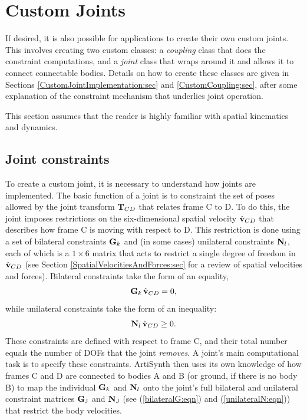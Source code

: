 \section{Custom Joints}

If desired, it is also possible for applications to create their own
custom joints. This involves creating two custom classes: a {\it
coupling} class that does the constraint computations, and a {\it
joint} class that wraps around it and allows it to connect connectable
bodies. Details on how to create these classes are given in
Sections \ref{CustomJointImplementation:sec} and
\ref{CustomCoupling:sec}, after some explanation
of the constraint mechanism that underlies joint operation.

This section assumes that the reader is highly familiar with spatial
kinematics and dynamics.

\subsection{Joint constraints}
\label{JointConstraints:sec}

To create a custom joint, it is necessary to understand how joints are
implemented. The basic function of a joint is to constraint the set of
poses allowed by the joint transform ${\bf T}_{CD}$ that relates frame C to
D. To do this, the joint imposes restrictions on the six-dimensional
spatial velocity $\hat{{\bf v}}_{CD}$ that describes how frame C is moving
with respect to D.  This restriction is done using a set of bilateral
constraints ${\bf G}_k$ and (in some cases) unilateral constraints ${\bf N}_l$,
each of which is a $1 \times 6$ matrix that acts to restrict a single
degree of freedom in $\hat{{\bf v}}_{CD}$ (see Section
\ref{SpatialVelocitiesAndForces:sec} for a review of
spatial velocities and forces). Bilateral constraints take the form of
an equality,
%
\begin{equation}
{\bf G}_k \, \hat{{\bf v}}_{CD} = 0,
\label{cbilateral:eqn}
\end{equation}
%
while unilateral constraints take the form of an inequality:
%
\begin{equation}
{\bf N}_l \, \hat{{\bf v}}_{CD} \ge 0.
\label{cunilateral:eqn}
\end{equation}
%
These constraints are defined with respect to frame C, and their total
number equals the number of DOFs that the joint {\it removes}. A
joint's main computational task is to specify these
constraints. ArtiSynth then uses its own knowledge of how frames C and
D are connected to bodies A and B (or ground, if there is no body B)
to map the individual ${\bf G}_k$ and ${\bf N}_l$ onto the joint's full
bilateral and unilateral constraint matrices ${\bf G}_\text{J}$ and ${\bf N}_\text{J}$ (see
(\ref{bilateralG:eqn}) and (\ref{unilateralN:eqn})) that restrict the
body velocities.

